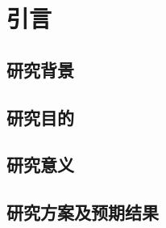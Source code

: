 \chapter{引\quad 言}
\renewcommand{\leftmark}{第一章\quad 引\quad 言}

\section{研究背景}
\blindtext

\Blindtext

\section{研究目的}
\blindtext

\lipsum[1]

\lipsum[4-8]

\section{研究意义}
\blindtext

\section{研究方案及预期结果}
\blindtext


